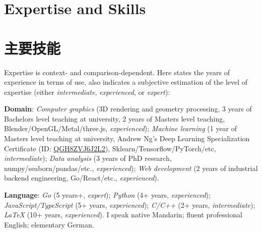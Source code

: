  {
  \section{\textbf{Expertise and Skills}}
}{
  \section{\textbf{主要技能}}
}
 {
\small
Expertise is context- and comparison-dependent. Here states the years of experience in terms of use, also indicates a subjective estimation of the level of expertise (either \emph{intermediate}, \emph{experienced}, or \emph{expert}):
\resumeSubHeadingListStart
\small
\item{\textbf{Domain}:
\emph{Computer graphics} (3D rendering and geometry processing, 3 years of Bachelors level teaching at university, 2 years of Masters level teaching, Blender/OpenGL/Metal/three.js, \emph{experienced});
\emph{Machine learning} (1 year of Masters level teaching at university, Andrew Ng's Deep Learning Specialization Certificate (ID: \href{https://www.coursera.org/account/accomplishments/specialization/QGH8ZVJ6J2L2}{QGH8ZVJ6J2L2}), Sklearn/Tensorflow/PyTorch/etc, \emph{intermediate});
\emph{Data analysis} (3 years of PhD research, numpy/seaborn/pandas/etc., \emph{experienced});
\emph{Web development} (2 years of industrial backend engineering, Go/React/etc., \emph{experienced}).
}
\item{\textbf{Language}:
\emph{Go} (5 years+, \emph{expert});
\emph{Python} (4+ years, \emph{experienced});
\emph{JavaScript/TypeScript} (5+ years, \emph{experienced});
\emph{C/C++} (2+ years, \emph{intermediate});
\emph{\LaTeX} (10+ years, \emph{experienced}).
I speak native Mandarin; fluent professional English; elementary German.
}
\resumeSubHeadingListEnd
}{
\resumeSubHeadingListStart
\small
\item{
}}
